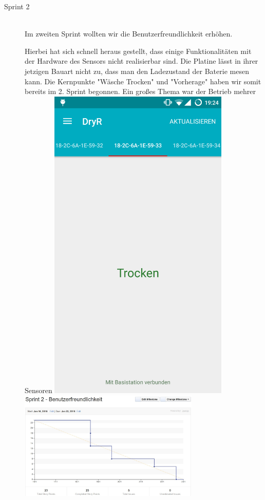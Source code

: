 \begin{description}
\begin{description}
		\end{description}
	\item [Sprint 2] \hfill \\
		Im zweiten Sprint wollten wir die Benutzerfreundlichkeit erhöhen.
		\begin{description}
			Hierbei hat sich schnell heraus gestellt, dass einige Funktionalitäten mit der Hardware des Sensors nicht realisierbar sind. Die Platine lässt in ihrer jetzigen Bauart nicht zu, dass man den Ladezustand der Baterie mesen kann. Die Kernpunkte "Wäsche Trocken" und "Vorherage" haben wir somit bereits im 2. Sprint begonnen. Ein großes Thema war der Betrieb mehrer Sensoren 
			\includegraphics[width=0.7\textwidth]{laundry_status_multiple_sensors.png}
			\includegraphics[width=0.7\textwidth]{burndown_sprint2.jpg}

\end{description}
\end{description}
